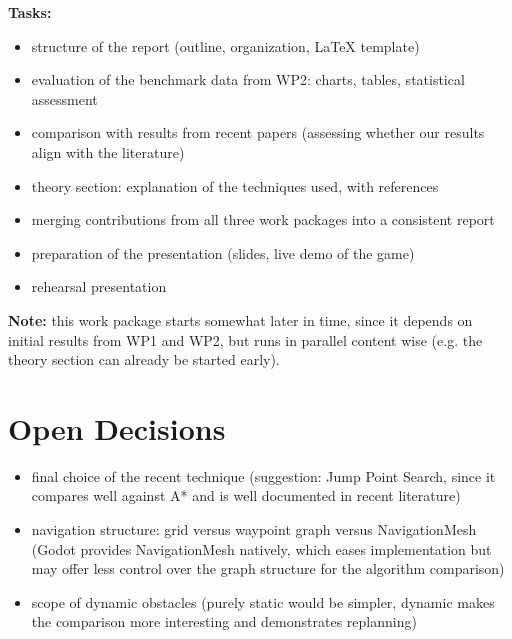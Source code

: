 \documentclass[11pt,a4paper]{article}
\begin{document}
\textbf{Tasks:}
\begin{itemize}[leftmargin=1.2em]
  \item structure of the report (outline, organization, LaTeX template)
  \item evaluation of the benchmark data from WP2: charts, tables,
  statistical assessment
  \item comparison with results from recent papers (assessing whether our
  results align with the literature)
  \item theory section: explanation of the techniques used, with
  references
  \item merging contributions from all three work packages into a
  consistent report
  \item preparation of the presentation (slides, live demo of the game)
  \item rehearsal presentation
\end{itemize}

\textbf{Note:} this work package starts somewhat later in time, since it
depends on initial results from WP1 and WP2, but runs in parallel
content wise (e.g. the theory section can already be started early).



\section{Open Decisions}

\begin{itemize}[leftmargin=1.2em]
  \item final choice of the recent technique (suggestion: Jump Point
  Search, since it compares well against A* and is well documented in
  recent literature)
  \item navigation structure: grid versus waypoint graph versus
  NavigationMesh (Godot provides NavigationMesh natively, which eases
  implementation but may offer less control over the graph structure for
  the algorithm comparison)
  \item scope of dynamic obstacles (purely static would be simpler,
  dynamic makes the comparison more interesting and demonstrates
  replanning)
\end{itemize}
\end{document}
